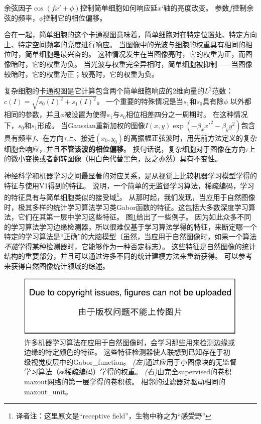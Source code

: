 余弦因子$ \cos (fx' + \phi)$控制简单细胞如何响应延$x‘$轴的亮度改变。
参数$f$控制余弦的频率，$\phi$控制它的相位偏移。

合在一起，简单细胞的这个卡通视图意味着，简单细胞对在特定位置处、特定方向上、特定空间频率的亮度进行响应。
当图像中的光波与细胞的权重具有相同的相位时，简单细胞是最兴奋的。
这种情况发生在当图像亮时，它的权重为正，而图像暗时，它的权重为负。
当光波与权重完全异相时，简单细胞被抑制——当图像较暗时，它的权重为正；较亮时，它的权重为负。
 
 
复杂细胞的卡通视图是它计算包含两个简单细胞响应的2维向量的$L^2$范数：$c(I)=\sqrt{s_0(I)^2 + s_1(I)^2}$。
一个重要的特殊情况是当$s_1$和$s_0$具有除$\phi$ 以外都相同的参数，并且$\phi$被设置为使得$s_1$与$s_0$相位相差四分之一周期时。
在这种情况下，$s_0$和$s_1$形成。
当Gaussian重新加权的图像$I(x,y)\exp(-\beta_x x'^2 -\beta_y y^2)$包含具有频率$f$、在方向$\tau$上、接近$(x_0, y_0)$的高振幅正弦波时，用先前方法定义的复杂细胞会响应，并且\textbf{不管该波的相位偏移}。
换句话说，复杂细胞对于图像在方向$\tau$上的微小变换或者翻转图像（用白色代替黑色，反之亦然）具有不变性。

神经科学和机器学习之间最显著的对应关系，是从视觉上比较机器学习模型学得的特征与使用V1得到的特征。
\cite{Olshausen+Field-1996}说明，一个简单的无监督学习算法，稀疏编码，学习的特征具有与简单细胞类似的接受域\footnote{译者注：这里原文是``receptive field''，生物中称之为``感受野''}。
从那时起，我们发现，当应用于自然图像时，极其多样的统计学习算法学习类Gabor函数的特征。这包括大多数深度学习算法，它们在其第一层中学习这些特征。
图\ref{fig:chap9_feature_detectors}给出了一些例子。
因为如此众多不同的学习算法学习边缘检测器，所以很难仅基于学习算法学得的特征，来断定哪一个特定的学习算法是``正确''的大脑模型（虽然，当应用于自然图像时，如果一个算法\emph{不能}学得某种检测器时，它能够作为一种否定标志）。
这些特征是自然图像的统计结构的重要部分，并且可以通过许多不同的统计建模方法来重新获得。
可以参考\citep{hyvarinen-book2009}来获得自然图像统计领域的综述。
\begin{figure}
\ifOpenSource
\centerline{\includegraphics{figure.pdf}}
\else
\centering    
{}     
\fi
\caption{许多机器学习算法在应用于自然图像时，会学习那些用来检测边缘或边缘的特定颜色的特征。
这些特征检测器使人联想到已知存在于初级视觉皮层中的\gls{Gabor_function}。
\emph{(左)}通过应用于小图像块的无监督学习算法（\gls{ss}稀疏编码）学得的权重。%
\emph{(右)}由完全\gls{supervised}的卷积\gls{maxout}网络的第一层学得的卷积核。 相邻的过滤器对驱动相同的\gls{maxout_unit}。}     
\label{fig:chap9_feature_detectors}     
\end{figure}

